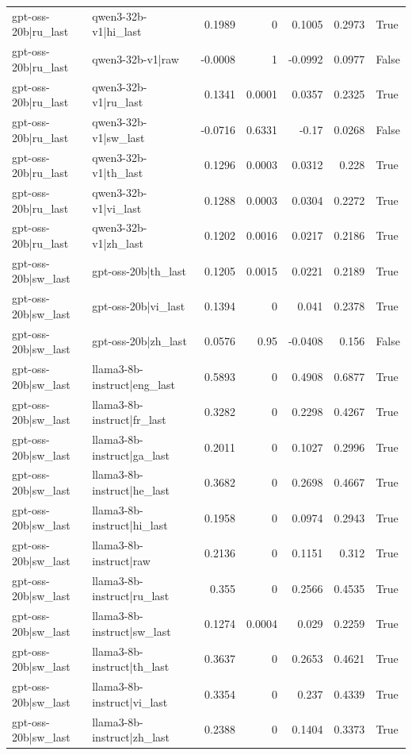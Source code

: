\begin{table}
\begin{tabular}{l l r r r r l}
gpt-oss-20b|ru_last & qwen3-32b-v1|hi_last & 0.1989 & 0 & 0.1005 & 0.2973 & True \\
gpt-oss-20b|ru_last & qwen3-32b-v1|raw & -0.0008 & 1 & -0.0992 & 0.0977 & False \\
gpt-oss-20b|ru_last & qwen3-32b-v1|ru_last & 0.1341 & 0.0001 & 0.0357 & 0.2325 & True \\
gpt-oss-20b|ru_last & qwen3-32b-v1|sw_last & -0.0716 & 0.6331 & -0.17 & 0.0268 & False \\
gpt-oss-20b|ru_last & qwen3-32b-v1|th_last & 0.1296 & 0.0003 & 0.0312 & 0.228 & True \\
gpt-oss-20b|ru_last & qwen3-32b-v1|vi_last & 0.1288 & 0.0003 & 0.0304 & 0.2272 & True \\
gpt-oss-20b|ru_last & qwen3-32b-v1|zh_last & 0.1202 & 0.0016 & 0.0217 & 0.2186 & True \\
gpt-oss-20b|sw_last & gpt-oss-20b|th_last & 0.1205 & 0.0015 & 0.0221 & 0.2189 & True \\
gpt-oss-20b|sw_last & gpt-oss-20b|vi_last & 0.1394 & 0 & 0.041 & 0.2378 & True \\
gpt-oss-20b|sw_last & gpt-oss-20b|zh_last & 0.0576 & 0.95 & -0.0408 & 0.156 & False \\
gpt-oss-20b|sw_last & llama3-8b-instruct|eng_last & 0.5893 & 0 & 0.4908 & 0.6877 & True \\
gpt-oss-20b|sw_last & llama3-8b-instruct|fr_last & 0.3282 & 0 & 0.2298 & 0.4267 & True \\
gpt-oss-20b|sw_last & llama3-8b-instruct|ga_last & 0.2011 & 0 & 0.1027 & 0.2996 & True \\
gpt-oss-20b|sw_last & llama3-8b-instruct|he_last & 0.3682 & 0 & 0.2698 & 0.4667 & True \\
gpt-oss-20b|sw_last & llama3-8b-instruct|hi_last & 0.1958 & 0 & 0.0974 & 0.2943 & True \\
gpt-oss-20b|sw_last & llama3-8b-instruct|raw & 0.2136 & 0 & 0.1151 & 0.312 & True \\
gpt-oss-20b|sw_last & llama3-8b-instruct|ru_last & 0.355 & 0 & 0.2566 & 0.4535 & True \\
gpt-oss-20b|sw_last & llama3-8b-instruct|sw_last & 0.1274 & 0.0004 & 0.029 & 0.2259 & True \\
gpt-oss-20b|sw_last & llama3-8b-instruct|th_last & 0.3637 & 0 & 0.2653 & 0.4621 & True \\
gpt-oss-20b|sw_last & llama3-8b-instruct|vi_last & 0.3354 & 0 & 0.237 & 0.4339 & True \\
gpt-oss-20b|sw_last & llama3-8b-instruct|zh_last & 0.2388 & 0 & 0.1404 & 0.3373 & True \\

\end{tabular}
\end{table}
